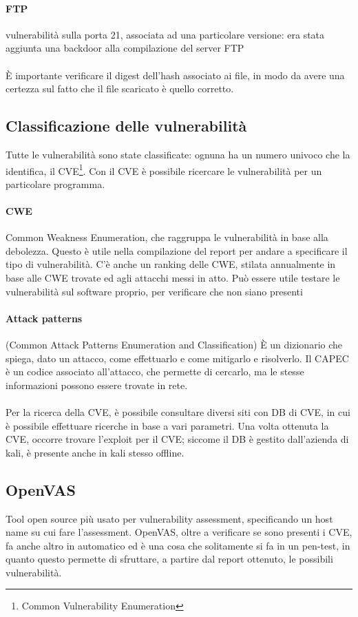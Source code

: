 \documentclass{article}
\begin{document}
\paragraph{FTP}vulnerabilità sulla porta 21, associata ad una particolare versione: era stata aggiunta una backdoor alla compilazione del server FTP
\\\\ È importante verificare il digest dell'hash associato ai file, in modo da avere una certezza sul fatto che il file scaricato è quello corretto.
\subsection{Classificazione delle vulnerabilità}
Tutte le vulnerabilità sono state classificate: ognuna ha un numero univoco che la identifica, il CVE\footnote{Common Vulnerability Enumeration}. Con il CVE è possibile ricercare le vulnerabilità per un particolare programma.
\paragraph{CWE} Common Weakness Enumeration, che raggruppa le vulnerabilità in base alla debolezza. Questo è utile nella compilazione del report per andare a specificare il tipo di vulnerabilità. C'è anche un ranking delle CWE, stilata annualmente in base alle CWE trovate ed agli attacchi messi in atto. Può essere utile testare le vulnerabilità sul software proprio, per verificare che non siano presenti
\paragraph{Attack patterns}
(Common Attack Patterns Enumeration and Classification) È un dizionario che spiega, dato un attacco, come effettuarlo e come mitigarlo e risolverlo. Il CAPEC è un codice associato all'attacco, che permette di cercarlo, ma le stesse informazioni possono essere trovate in rete.\\\\ Per la ricerca della CVE, è possibile consultare diversi siti con DB di CVE, in cui è possibile effettuare ricerche in base a vari parametri. Una volta ottenuta la CVE, occorre trovare l'exploit per il CVE; siccome il DB è gestito dall'azienda di kali, è presente anche in kali stesso offline.
\subsection{OpenVAS}
Tool open source più usato per vulnerability assessment, specificando un host name su cui fare l'assessment. OpenVAS, oltre a verificare se sono presenti i CVE, fa anche altro in automatico ed è una cosa che solitamente si fa in un pen-test, in quanto questo permette di sfruttare, a partire dal report ottenuto, le possibili vulnerabilità.
\end{document}
